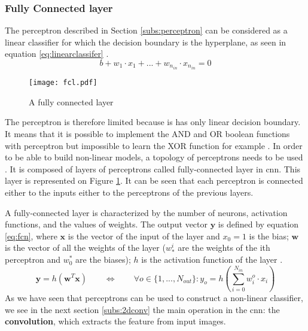\subsubsection{Fully Connected layer} \label{subs:fcl}
The perceptron described in Section \ref{subs:perceptron} can be considered as a linear classifier for which the decision boundary is the hyperplane, as seen in equation \eqref{eq:linearclassifer} \cite{matteucci_artificial_2019}.
%
\begin{equation}
    b + w_1 \cdot x_1 + ... + w_{n_{in}} \cdot x_{n_{in}} = 0
    \label{eq:linearclassifer}
\end{equation}
%
\begin{figure}
    \centering
    \texttt{[image: fcl.pdf]}
    \caption{A fully connected layer}
    \label{fig:fcn}
\end{figure}
%
The perceptron is therefore limited because is has only linear decision boundary. It means that it is possible to implement the AND and OR boolean functions with perceptron but impossible to learn the XOR function for example \cite{minsky_perceptrons_1972}. In order to be able to build non-linear models, a topology of perceptrons needs to be used \cite{khan_survey_2020}. It is composed of layers of perceptrons called fully-connected layer in \acrshort{cnn}. This layer is represented on Figure \ref{fig:fcn}. It can be seen that each perceptron is connected either to the inputs either to the perceptrons of the previous layers.

A fully-connected layer is characterized by the number of neurons, activation functions, and the values of weights. The output vector $\boldsymbol{y}$ is defined by equation \eqref{eq:fcn}, where $\boldsymbol{x}$ is the vector of the input of the layer and $x_0 = 1$ is the bias; $\boldsymbol{w}$ is the vector of all the weights of the layer ($w^i_*$ are the weights of the ith perceptron and $w^*_0$ are the biases); $h$ is the activation function of the layer \cite{abdelouahab_accelerating_2018}.
%
\begin{equation}
    \boldsymbol{y} = h(\boldsymbol{w}^T \boldsymbol{x}) \qquad \Leftrightarrow \qquad \forall o \in \{ 1, ..., N_{out} \} : y_o = h(\sum^{N_{in}}_{i=0} w^o_i \cdot x_i)
    \label{eq:fcn}
\end{equation}
%
As we have seen that perceptrons can be used to construct a non-linear classifier, we see in the next section \ref{subs:2dconv} the main operation in the \acrshort{cnn}: the \textbf{convolution}, which extracts the feature from input images.
